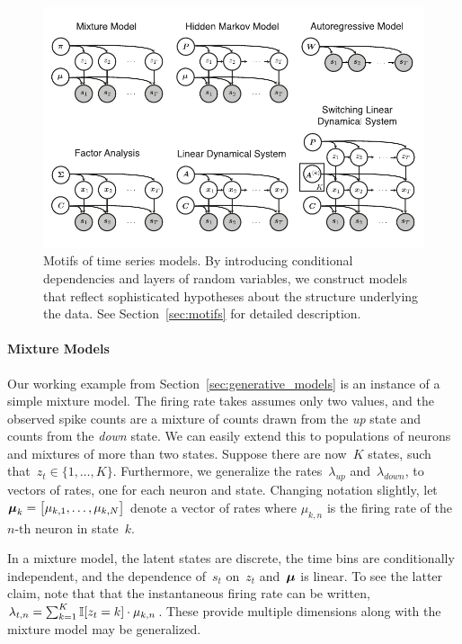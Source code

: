 \begin{figure}[t]
  \centering%
\includegraphics[width=5.5in]{figures/ch2/figure2b} 
\vspace{-.25in}
\caption[Motifs of time series models]{Motifs of time series models.
  By introducing conditional dependencies and layers of random
  variables, we construct models that reflect sophisticated hypotheses
  about the structure underlying the data.  See
  Section~\ref{sec:motifs} for detailed description.}
\label{fig:motifs}
\end{figure}


\paragraph{Mixture Models}
Our working example from Section~\ref{sec:generative_models} is an
instance of a simple mixture model.  The firing rate takes assumes
only two values, and the observed spike counts are a mixture of counts
drawn from the \textit{up} state and counts from the \textit{down}
state. We can easily extend this to populations of neurons and
mixtures of more than two states.  Suppose there are now~$K$ states,
such that~${z_t \in \{1, \ldots, K\}}$. Furthermore, we generalize the
rates~$\lambda_{\textit{up}}$ and~$\lambda_{\textit{down}}$, to
vectors of rates, one for each neuron and state.  Changing notation
slightly, let~${\boldsymbol{\mu}_k =
  \big[ \mu_{k,1}, \ldots, \mu_{k,N}\big]}$ denote a vector
of rates where $\mu_{k,n}$ is the firing rate of
the~${n\text{-th}}$ neuron in state~$k$.

In a mixture model, the latent states are discrete, the time bins are
conditionally independent, and the dependence of~$s_t$ on~$z_t$
and~$\boldsymbol{\mu}$ is linear.  To see the latter claim, note that that the
instantaneous firing rate can be written, ${\lambda_{t,n} =
  \sum_{k=1}^K \mathbb{I}[z_t=k] \cdot \mu_{k,n}}$. These provide multiple
dimensions along with the mixture model may be generalized.

